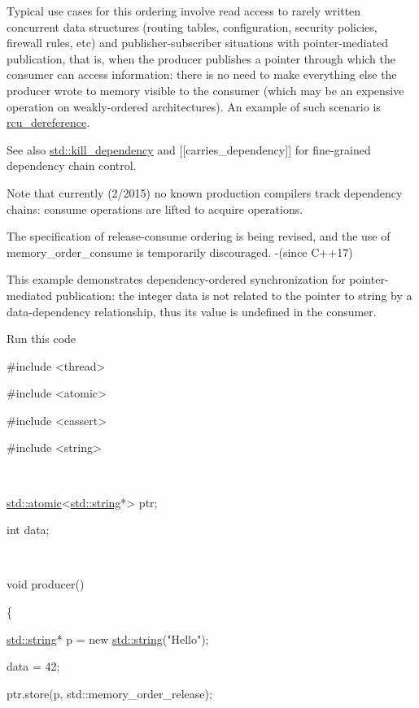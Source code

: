 \documentclass[
]{article}
\begin{document}
Typical use cases for this ordering involve read access to rarely
written concurrent data structures (routing tables, configuration,
security policies, firewall rules, etc) and publisher-subscriber
situations with pointer-mediated publication, that is, when the producer
publishes a pointer through which the consumer can access information:
there is no need to make everything else the producer wrote to memory
visible to the consumer (which may be an expensive operation on
weakly-ordered architectures). An example of such scenario is
\href{https://en.wikipedia.org/wiki/Read-copy-update}{rcu\_dereference}.

See also
\href{https://en.cppreference.com/w/cpp/atomic/kill_dependency}{std::kill\_dependency}
and {[}{[}carries\_dependency{]}{]} for fine-grained dependency chain
control.

Note that currently (2/2015) no known production compilers track
dependency chains: consume operations are lifted to acquire operations.

The specification of release-consume ordering is being revised, and the
use of memory\_order\_consume is temporarily discouraged. -(since C++17)

This example demonstrates dependency-ordered synchronization for
pointer-mediated publication: the integer data is not related to the
pointer to string by a data-dependency relationship, thus its value is
undefined in the consumer.

Run this code

\#include \textless thread\textgreater{}

\#include \textless atomic\textgreater{}

\#include \textless cassert\textgreater{}

\#include \textless string\textgreater{}

~

\href{http://en.cppreference.com/w/cpp/atomic/atomic}{std::atomic}\textless{}\href{http://en.cppreference.com/w/cpp/string/basic_string}{std::string}*\textgreater{}
ptr;

int data;

~

void producer()

\{

\href{http://en.cppreference.com/w/cpp/string/basic_string}{std::string}*
p = new
\href{http://en.cppreference.com/w/cpp/string/basic_string}{std::string}("Hello");

data = 42;

ptr.store(p, std::memory\_order\_release);
\end{document}
